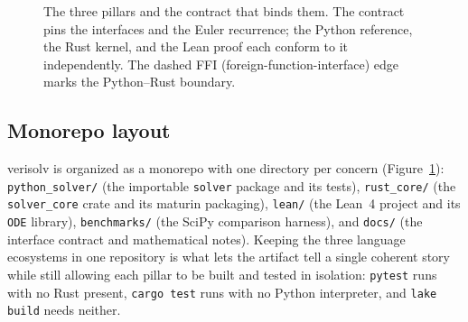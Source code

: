 \documentclass[sigplan,nonacm,screen,review]{acmart}
\begin{document}
\begin{figure}[t]
\centering
{}
\caption{The three pillars and the contract that binds them. The contract pins
the interfaces and the Euler recurrence; the Python reference, the Rust kernel,
and the Lean proof each conform to it independently. The dashed FFI
(foreign-function-interface) edge marks the Python--Rust boundary.}
\label{fig:arch}
\end{figure}

\subsection{Monorepo layout}
verisolv is organized as a monorepo with one directory per concern
(Figure~\ref{fig:arch}):
\texttt{python\_solver/} (the importable \texttt{solver} package and its tests),
\texttt{rust\_core/} (the \texttt{solver\_core} crate and its maturin packaging),
\texttt{lean/} (the Lean~4 project and its \texttt{ODE} library),
\texttt{benchmarks/} (the SciPy comparison harness), and \texttt{docs/} (the
interface contract and mathematical notes). Keeping the three language
ecosystems in one repository is what lets the artifact tell a single coherent
story while still allowing each pillar to be built and tested in isolation:
\texttt{pytest} runs with no Rust present, \texttt{cargo test} runs with no
Python interpreter, and \texttt{lake build} needs neither.
\end{document}
